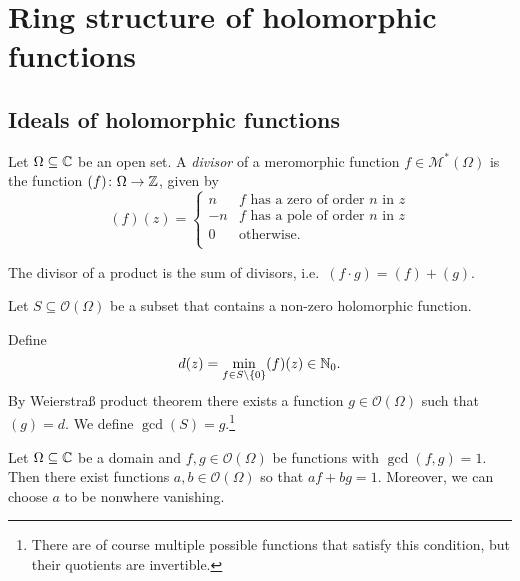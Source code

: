 \section{Ring structure of holomorphic functions}

\subsection{Ideals of holomorphic functions}

\begin{definicija}
Let $\Omega \subseteq \mathbb{C}$ be an open set. A
\emph{divisor} of a meromorphic function
$f \in \mathcal{M}^*(\Omega)$ is the function
$(f) \colon \Omega \to \mathbb{Z}$, given by
\[
(f)(z) = \begin{cases}
 n & \text{$f$ has a zero of order $n$ in $z$} \\
-n & \text{$f$ has a pole of order $n$ in $z$} \\
 0 & \text{otherwise}.                         \\
\end{cases}
\]
\end{definicija}

\begin{opomba}
The divisor of a product is the sum of divisors,
i.e.~$(f \cdot g) = (f) + (g)$.
\end{opomba}

\begin{definicija}
Let $S \subseteq \mathcal{O}(\Omega)$ be a subset that contains a
non-zero holomorphic function.

Define
\[
d(z) = \min_{f \in S \setminus \left\{0\right\}} (f)(z) \in \mathbb{N}_0.
\]
By Weierstraß product theorem there exists a function
$g \in \mathcal{O}(\Omega)$ such that $(g) = d$. We define
$\gcd(S) = g$.\footnote{There are of
course multiple possible functions that satisfy this condition, but
their quotients are invertible.}
\end{definicija}


\begin{lema}[Wedderburn]
Let $\Omega \subseteq \mathbb{C}$ be a domain and
$f, g \in \mathcal{O}(\Omega)$ be functions with $\gcd(f, g) = 1$.
Then there exist functions $a, b \in \mathcal{O}(\Omega)$ so that
$a f + b g = 1$. Moreover, we can choose $a$ to be nonwhere
vanishing. 
\end{lema}

